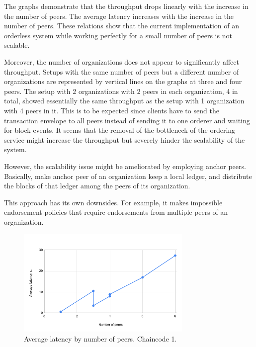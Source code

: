 The graphs demonstrate that the throughput drops linearly with the increase in the number of peers. The average latency increases with the increase in the number of peers. These relations show that the current implementation of an orderless system while working perfectly for a small number of peers is not scalable.

Moreover, the number of organizations does not appear to significantly affect throughput. Setups with the same number of peers but a different number of organizations are represented by vertical lines on the graphs at three and four peers. The setup with 2 organizations with 2 peers in each organization, 4 in total, showed essentially the same throughput as the setup with 1 organization with 4 peers in it. This is to be expected since clients have to send the transaction envelope to all peers instead of sending it to one orderer and waiting for block events. It seems that the removal of the bottleneck of the ordering service might increase the throughput but severely hinder the scalability of the system.

However, the scalability issue might be ameliorated by employing anchor peers. Basically, make anchor peer of an organization keep a local ledger, and distribute the blocks of that ledger among the peers of its organization.

This approach has its own downsides. For example, it makes impossible endorsement policies that require endorsements from multiple peers of an organization.

\newpage

\begin{figure}[H]
\begin{center}
\includegraphics[width=0.75\textwidth]{figures/avglat1}
\end{center}
\caption{Average latency by number of peers. Chaincode 1.}
\label{fig:avglat1}
\end{figure}

